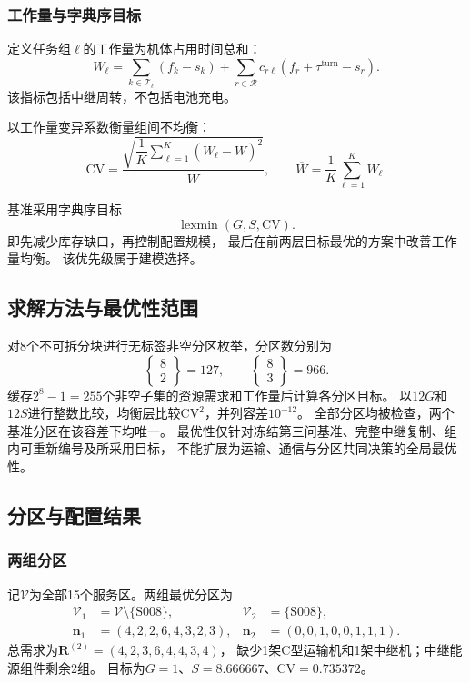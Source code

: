 \documentclass[bwprint]{gmcmthesis}
\begin{document}
\subsubsection{工作量与字典序目标}

定义任务组$\ell$的工作量为机体占用时间总和：
\begin{equation}
W_\ell
=
\sum_{k\in\mathcal{T}_\ell}(f_k-s_k)
+
\sum_{r\in\mathcal{R}}
c_{r\ell}(f_r+\tau^{\mathrm{turn}}-s_r).
\end{equation}
该指标包括中继周转，不包括电池充电。

以工作量变异系数衡量组间不均衡：
\begin{equation}
\mathrm{CV}
=
\frac{
\sqrt{\dfrac{1}{K}\sum_{\ell=1}^{K}(W_\ell-\overline{W})^2}
}{\overline{W}},
\qquad
\overline{W}=\frac{1}{K}\sum_{\ell=1}^{K}W_\ell.
\end{equation}

基准采用字典序目标
\begin{equation}
\operatorname{lexmin}(G,S,\mathrm{CV}).
\end{equation}
即先减少库存缺口，再控制配置规模，
最后在前两层目标最优的方案中改善工作量均衡。
该优先级属于建模选择。

\subsection{求解方法与最优性范围}
对8个不可拆分块进行无标签非空分区枚举，分区数分别为
\begin{equation}
\left\{\begin{matrix}8\\2\end{matrix}\right\}=127,
\qquad
\left\{\begin{matrix}8\\3\end{matrix}\right\}=966.
\end{equation}
缓存$2^8-1=255$个非空子集的资源需求和工作量后计算各分区目标。
以$12G$和$12S$进行整数比较，均衡层比较$\mathrm{CV}^2$，并列容差$10^{-12}$。
全部分区均被检查，两个基准分区在该容差下均唯一。
最优性仅针对冻结第三问基准、完整中继复制、组内可重新编号及所采用目标，
不能扩展为运输、通信与分区共同决策的全局最优性。

\subsection{分区与配置结果}
\subsubsection{两组分区}
记$\mathcal V$为全部15个服务区。两组最优分区为
\begin{align}
\mathcal V_1&=\mathcal V\setminus\{\mathrm{S008}\},&
\mathcal V_2&=\{\mathrm{S008}\},\\
\boldsymbol n_1&=(4,2,2,6,4,3,2,3),&
\boldsymbol n_2&=(0,0,1,0,0,1,1,1).
\end{align}
总需求为$\boldsymbol R^{(2)}=(4,2,3,6,4,4,3,4)$，
缺少1架C型运输机和1架中继机；中继能源组件剩余2组。
目标为$G=1$、$S=8.666667$、$\mathrm{CV}=0.735372$。
\end{document}
